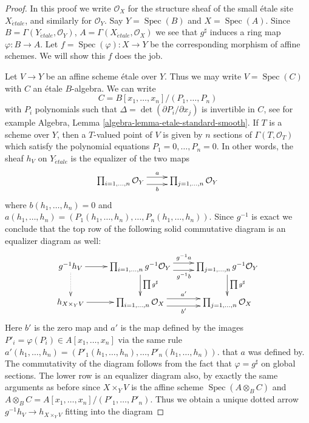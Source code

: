 \documentclass[10pt,a4paper]{amsart}
\theoremstyle{plain}
\theoremstyle{definition}
\theoremstyle{remark}
\numberwithin{equation}{subsection}
\def\Spec{\mathop{\mathrm{Spec}}}
\def\etale{{\acute{e}tale}}
\begin{document}
\begin{proof}
In this proof we write $\mathcal{O}_X$ for the structure sheaf
of the small \'etale site $X_\etale$, and similarly for
$\mathcal{O}_Y$. Say $Y = \Spec(B)$ and $X = \Spec(A)$. Since
$B = \Gamma(Y_\etale, \mathcal{O}_Y)$,
$A = \Gamma(X_\etale, \mathcal{O}_X)$
we see that $g^\sharp$ induces a ring map $\varphi : B \to A$.
Let $f = \Spec(\varphi) : X \to Y$ be the corresponding morphism
of affine schemes. We will show this $f$ does the job.

\medskip\noindent
Let $V \to Y$ be an affine scheme \'etale over $Y$. Thus we may write
$V = \Spec(C)$ with $C$ an \'etale $B$-algebra. We can write
$$
C = B[x_1, \ldots, x_n]/(P_1, \ldots, P_n)
$$
with $P_i$ polynomials such that $\Delta = \det(\partial P_i/ \partial x_j)$
is invertible in $C$, see for example
Algebra, Lemma \ref{algebra-lemma-etale-standard-smooth}.
If $T$ is a scheme over $Y$, then a $T$-valued point of $V$ is given by
$n$ sections of $\Gamma(T, \mathcal{O}_T)$ which satisfy the polynomial
equations $P_1 = 0, \ldots, P_n = 0$. In other words, the sheaf $h_V$
on $Y_\etale$ is the equalizer of the two maps
$$
\xymatrix{
\prod\nolimits_{i = 1, \ldots, n} \mathcal{O}_Y
\ar@<1ex>[r]^a \ar@<-1ex>[r]_b &
\prod\nolimits_{j = 1, \ldots, n} \mathcal{O}_Y
}
$$
where $b(h_1, \ldots, h_n) = 0$ and
$a(h_1, \ldots, h_n) =
(P_1(h_1, \ldots, h_n), \ldots, P_n(h_1, \ldots, h_n))$.
Since $g^{-1}$ is exact we conclude that the top row of the
following solid commutative diagram is an equalizer diagram as well:
$$
\xymatrix{
g^{-1}h_V \ar[r] \ar@{..>}[d] &
\prod\nolimits_{i = 1, \ldots, n} g^{-1}\mathcal{O}_Y
\ar@<1ex>[r]^{g^{-1}a} \ar@<-1ex>[r]_{g^{-1}b} \ar[d]^{\prod g^\sharp} &
\prod\nolimits_{j = 1, \ldots, n} g^{-1}\mathcal{O}_Y \ar[d]^{\prod g^\sharp}\\
h_{X \times_Y V} \ar[r] &
\prod\nolimits_{i = 1, \ldots, n} \mathcal{O}_X
\ar@<1ex>[r]^{a'} \ar@<-1ex>[r]_{b'} &
\prod\nolimits_{j = 1, \ldots, n} \mathcal{O}_X  \\
}
$$
Here $b'$ is the zero map and $a'$ is the map defined by the
images $P'_i = \varphi(P_i) \in A[x_1, \ldots, x_n]$ via the same
rule
$a'(h_1, \ldots, h_n) =
(P'_1(h_1, \ldots, h_n), \ldots, P'_n(h_1, \ldots, h_n))$.
that $a$ was defined by. The commutativity of the diagram follows from
the fact that $\varphi = g^\sharp$ on global sections. The lower
row is an equalizer diagram also, by exactly the same arguments as
before since $X \times_Y V$ is the affine scheme
$\Spec(A \otimes_B C)$ and
$A \otimes_B C = A[x_1, \ldots, x_n]/(P'_1, \ldots, P'_n)$.
Thus we obtain a unique dotted arrow
$g^{-1}h_V \to h_{X \times_Y V}$ fitting into the diagram


\end{proof}
\end{document}
